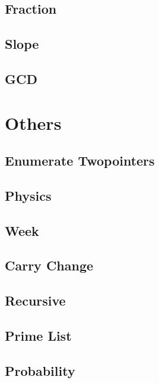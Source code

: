     \subsection{Fraction}
            
    \subsection{Slope}
            
    \subsection{GCD}
            

\section{Others}
    \subsection{Enumerate Twopointers}
            
    \subsection{Physics}
            
    \subsection{Week}
            
    \subsection{Carry Change}
            
    \subsection{Recursive}
            
    \subsection{Prime List}
            
    \subsection{Probability}
            

